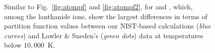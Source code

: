 \documentclass[traditabstract]{aa} %
\newcommand{\lawler}{Lawler \& Sneden}
\begin{document}
\begin{figure}[htp]
\centering
{}
\caption{Similar to Fig.~\ref{fig:atompf} and \ref{fig:atompf2}, for  and , which, among the lanthanide ions, show the largest differences in terms of partition function values between our NIST-based calculations (\emph{blue curves}) and {\lawler}'s (\emph{green dots}) data at temperatures below $10,000$~K.}
\label{fig:atompf3}
\end{figure}
\end{document}
